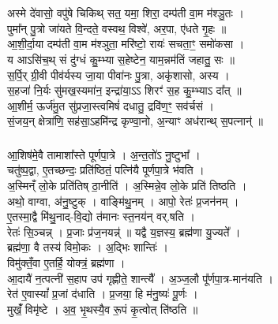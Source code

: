 \section{}
\subsubsection{}
अस्मे दे॑वासो॒ वपु॑षे चिकिथ् सत॒ यमा॒ शिरा॒ दम्प॑ती वा॒म म॑श्ञु॒तः ।\\
पुमा᳚न् पु॒त्रो जा॑यते वि॒न्दते॒ वस्वथ॒ विश्वे॑, अर॒पा, ए॑धते गृ॒हः ॥\\
आ॒शी॒र्दा॒या दम्प॑ती वा॒म म॑श्ञुता॒ मरि॑ष्टो॒ रायः॑ सचता॒ꣳ॒ समो॑कसा ।\\
य आऽसि॑च॒थ् सं दु॑ग्धं कु॒म्भ्या स॒हेष्टेन॒ याम॒न्नम॑तिं जहातु॒ सः ॥\\
स॒र्पि॒र् ग्री॒वी पीव॑र्यस्य जा॒या पीवा॑नः पु॒त्रा, अकृ॑शासो, अस्य ।\\
स॒हजा॑ नि॒र्यः सु॑मख॒स्यमा॑न॒ इन्द्रा॑या॒ऽऽ शिरꣳ॑ स॒ह कु॒म्भ्याऽ दा᳚त् ॥\\
आ॒शीर्म॒ ऊर्ज॑मु॒त सु॑प्रजा॒स्त्वमिषं॑ दधातु॒ द्रवि॑ण॒ꣳ॒ सव॑र्चसं ।\\
सं॒जय॒न् क्षेत्रा॑णि॒ सह॑सा॒ऽहमि॑न्द्र कृण्वा॒नो, अ॒न्याꣳ अध॑रान्थ् स॒पत्नान्॑ ॥\\
\subsubsection{}
आ॒शिष॑मे॒वै तामाशा᳚स्ते पूर्णपा॒त्रे । अ॒न्त॒तो॑ऽ नु॒ष्टुभा᳚ ।\\
चतु॑ष्प॒द्वा, ए॒तच्छन्दः॒ प्रति॑ष्ठितं॒ पत्नि॑यै पूर्णपा॒त्रे भ॑वति ।\\
अ॒स्मिन्ँ लो॒के प्रति॑तिष् ठा॒नीति॑ । अ॒स्मिन्ने॒व लो॒के प्रति॑ तिष्ठति ।\\
अथो॒ वाग्वा, अ॑नु॒ष्टुक् । वाङ्मि॑थु॒नम् । आपो॒ रेतः॑ प्र॒जन॑नम् ।\\
ए॒तस्मा॒द्वै मि॑थु॒नाद्-वि॒द्यो त॑मानः स्त॒नय॑न् वर्.षति ।\\
रेतः॑ सि॒ञ्चन्न् । प्र॒जाः प्र॑ज॒नयन्न्॑ ॥ यद्वै य॒ज्ञस्य॒ ब्रह्म॑णा यु॒ज्यते᳚ ।\\
ब्रह्म॑णा॒ वै तस्य॑ विमो॒कः । अ॒द्भिः शान्तिः॑ ।\\
विमु॑क्तँ॒वा ए॒तर्हि॒ योक्त्रं॒ ब्रह्म॑णा ।\\
आ॒दायै॑ न॒त्पत्नी॑ स॒हाप उप॑ गृह्णीते॒ शान्त्यै᳚ । अ॒ञ्ज॒लौ पू᳚र्णपा॒त्र-मान॑यति ।\\
रेत॑ ए॒वास्यां᳚ प्र॒जां द॑धाति । प्र॒जया॒ हि म॑नु॒ष्यः॑ पू॒र्णः ।\\
मुखंँ॒ विमृ॑ष्टे । अ॒व॒ भृ॒थस्यै॒व रू॒पं कृ॒त्वोत् ति॑ष्ठति ॥\\
